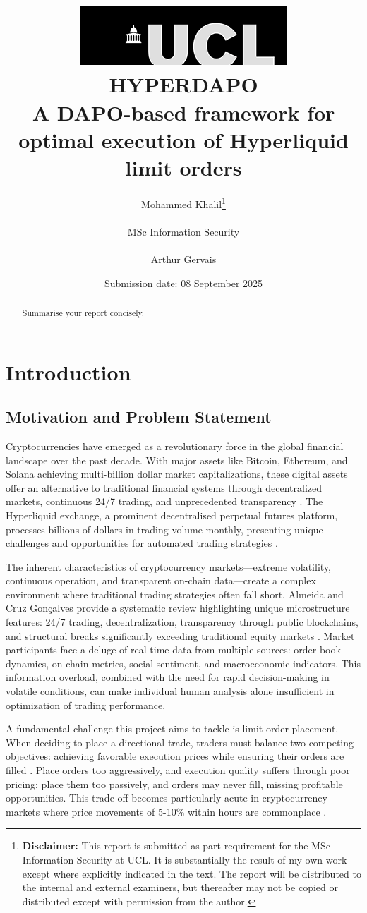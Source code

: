 \documentclass{report}
\title{  	{ \includegraphics[scale=.5]{ucl_logo.png}}\\
{{\Huge HYPERDAPO}}\\
{\large A DAPO-based framework for optimal execution of Hyperliquid limit orders}\\
		}
\date{Submission date: 08 September 2025}
\author{Mohammed Khalil\thanks{
{\bf Disclaimer:}
This report is submitted as part requirement for the MSc Information Security at UCL. It is
substantially the result of my own work except where explicitly indicated in the text.
\newline  %
The report will be distributed to the internal and external examiners, but thereafter may not be copied or distributed except with permission from the author.}
\\ \\
MSc Information Security\\ \\
Arthur Gervais}
\begin{document}
 
\onehalfspacing
\maketitle
\begin{abstract}
Summarise your report concisely.
\end{abstract}
\tableofcontents
\setcounter{page}{1}


\chapter{Introduction}

\section{Motivation and Problem Statement}

Cryptocurrencies have emerged as a revolutionary force in the global financial landscape over the past decade. With major assets like Bitcoin, Ethereum, and Solana achieving multi-billion dollar market capitalizations, these digital assets offer an alternative to traditional financial systems through decentralized markets, continuous 24/7 trading, and unprecedented transparency \cite{Nakamoto2008, Buterin2014}. The Hyperliquid exchange, a prominent decentralised perpetual futures platform, processes billions of dollars in trading volume monthly, presenting unique challenges and opportunities for automated trading strategies \cite{HyperliquidDocs2024}.

The inherent characteristics of cryptocurrency markets—extreme volatility, continuous operation, and transparent on-chain data—create a complex environment where traditional trading strategies often fall short. Almeida and Cruz Gon{\c{c}}alves provide a systematic review highlighting unique microstructure features: 24/7 trading, decentralization, transparency through public blockchains, and structural breaks significantly exceeding traditional equity markets \cite{Almeida2024}. Market participants face a deluge of real-time data from multiple sources: order book dynamics, on-chain metrics, social sentiment, and macroeconomic indicators. This information overload, combined with the need for rapid decision-making in volatile conditions, can make individual human analysis alone insufficient in optimization of trading performance.

A fundamental challenge this project aims to tackle is limit order placement. When deciding to place a directional trade, traders must balance two competing objectives: achieving favorable execution prices while ensuring their orders are filled \cite{Glosten1994, Harris2003}. Place orders too aggressively, and execution quality suffers through poor pricing; place them too passively, and orders may never fill, missing profitable opportunities. This trade-off becomes particularly acute in cryptocurrency markets where price movements of 5-10\% within hours are commonplace \cite{Baur2018}.
\end{document}
